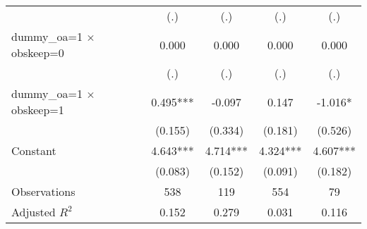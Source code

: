 \begin{table}[htbp]
\begin{tabular}{l*{4}{c}}
                    &         (.)   &         (.)   &         (.)   &         (.)   \\
dummy\_oa=1 $\times$ obskeep=0&       0.000   &       0.000   &       0.000   &       0.000   \\
                    &         (.)   &         (.)   &         (.)   &         (.)   \\
dummy\_oa=1 $\times$ obskeep=1&       0.495***&      -0.097   &       0.147   &      -1.016*  \\
                    &     (0.155)   &     (0.334)   &     (0.181)   &     (0.526)   \\
Constant            &       4.643***&       4.714***&       4.324***&       4.607***\\
                    &     (0.083)   &     (0.152)   &     (0.091)   &     (0.182)   \\
\hline
Observations        &         538   &         119   &         554   &          79   \\
Adjusted \(R^{2}\)  &       0.152   &       0.279   &       0.031   &       0.116   \\
\hline\hline
\end{tabular}
\end{table}
